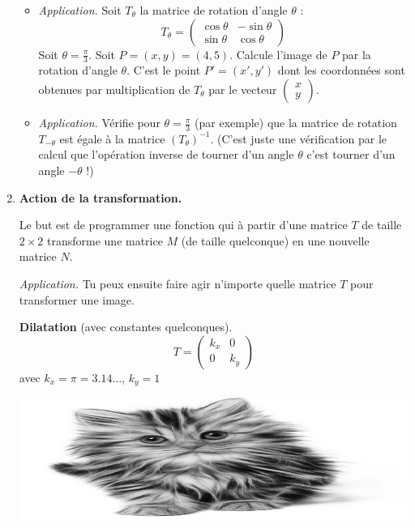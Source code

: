 \documentclass[11pt,class=report,crop=false]{standalone}
\begin{document}
\begin{activite}
\begin{enumerate}
\begin{itemize}
		\item \emph{Application.}
		Soit $T_\theta$ la matrice de rotation d'angle $\theta$ :
		$$T_\theta = \begin{pmatrix}\cos \theta& -\sin \theta\\\sin\theta&\cos\theta\end{pmatrix}$$
		Soit $\theta = \frac\pi3$. Soit $P = (x,y) = (4,5)$. Calcule l'image de $P$ par la rotation d'angle $\theta$. C'est le point $P' = (x',y')$ dont les coordonnées sont obtenues par multiplication de $T_\theta$ par le vecteur $\left(\begin{smallmatrix}x\\y\end{smallmatrix}\right)$.
		
		\item \emph{Application.}
		Vérifie pour $\theta=\frac\pi3$ (par exemple) que la matrice de rotation
		$T_{-\theta}$ est égale à la matrice $(T_\theta)^{-1}$. (C'est juste une vérification par le calcul que l'opération inverse de tourner d'un angle $\theta$ c'est tourner d'un angle $-\theta$ !)
		
	\end{itemize}

	\item \textbf{Action de la transformation.}

	Le but est de programmer une fonction  qui à partir d'une matrice $T$ de taille $2\times 2$ transforme une matrice $M$ (de taille quelconque)
	en une nouvelle matrice $N$.
	
	\emph{Application.} Tu peux ensuite faire agir n'importe quelle matrice $T$ pour transformer une image.
	
	\begin{center}
	\begin{minipage}{0.5\textwidth}
	\centering
		\textbf{Dilatation} (avec constantes quelconques).
		$$T = \begin{pmatrix}k_x&0\\0&k_y\end{pmatrix}$$
		avec $k_x=\pi=3.14\ldots$, $k_y = 1$	
	\end{minipage}
	\begin{minipage}{0.4\textwidth}\center
		\includegraphics[scale=\myscale,scale=0.3]{png/chat_dilatation}
	\end{minipage}	
    \end{center}
	

\end{enumerate}
\end{activite}
\end{document}
